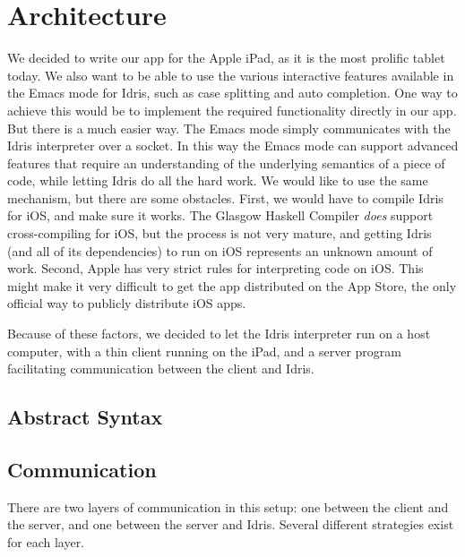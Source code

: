 \section{Architecture}
\label{sec:Architecture}

We decided to write our app for the Apple iPad, as it is the most prolific
tablet today. We also want to be able to use the various interactive features
available in the Emacs mode for Idris, such as case
splitting and auto completion. One way to achieve this would be to implement
the required functionality directly in our app. But there is a much easier way.
The Emacs mode simply communicates with the Idris interpreter over a socket. 
In this way the Emacs mode can support advanced features that require an
understanding of the underlying semantics of a piece of code, while letting
Idris do all the hard work. We would like to use the same mechanism, but there
are some obstacles. First, we would have to compile Idris for iOS, and make 
sure it works. The Glasgow Haskell Compiler \emph{does} support 
cross-compiling for iOS, but the process is not very mature, and
getting Idris (and all of its dependencies) to run on iOS represents an 
unknown amount of work. Second, Apple has very strict rules for interpreting
code on iOS\@. This might make it very difficult to get the app distributed on
the App Store, the only official way to publicly distribute iOS apps.

Because of these factors, we decided to let the Idris interpreter run on a 
host computer, with a thin client running on the iPad, and a server program 
facilitating communication between the client and Idris.

\subsection{Abstract Syntax}
\label{subsec:AbstractSyntax}



\subsection{Communication}
There are two layers of communication in this setup: one between the client and
the server, and one between the server and Idris. Several different strategies
exist for each layer. 

